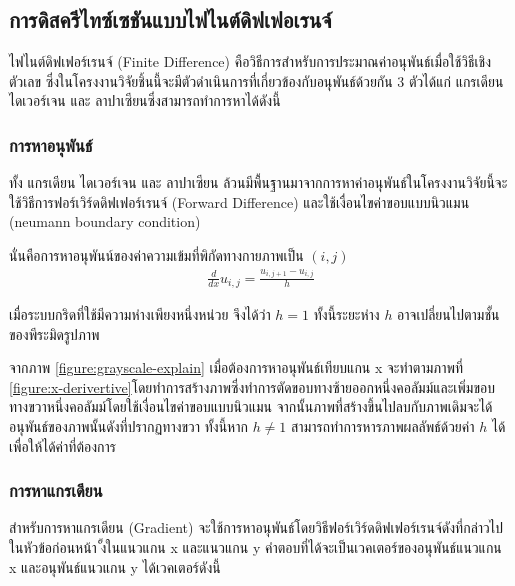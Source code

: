 \subsection{การดิสครีไทซ์เซชันแบบไฟไนต์ดิฟเฟอเรนจ์}

\hspace{1cm}ไฟไนต์ดิฟเฟอร์เรนจ์ (Finite Difference) คือวิธีการสำหรับการประมาณค่าอนุพันธ์เมื่อใช้วิธีเชิงตัวเลข ซึ่งในโครงงานวิจัยชิ้นนี้จะมีตัวดำเนินการที่เกี่ยวข้องกับอนุพันธ์ด้วยกัน 3 ตัวได้แก่ แกรเดียน ไดเวอร์เจน และ ลาปาเซียนซึ่งสามารถทำการหาได้ดังนี้

\subsubsection{การหาอนุพันธ์}

\hspace{1cm}ทั้ง แกรเดียน ไดเวอร์เจน และ ลาปาเซียน ล้วนมีพื้นฐานมาจากการหาค่าอนุพันธ์ในโครงงานวิจัยนี้จะใช้วิธีการฟอร์เวิร์ดดิฟเฟอร์เรนจ์ (Forward Difference) และใช้เงื่อนไขค่าขอบแบบนิวแมน (neumann boundary condition)

\noindent\hspace{1cm}นั่นคือการหาอนุพันน์ของค่าความเข้มที่พิกัดทางกายภาพเป็น $(i,j)$
\begin{align*}
	\frac{d}{dx} u_{i,j} = \frac{u_{i,j+1} - u_{i,j}}{h}
\end{align*}

เมื่อระบบกริดที่ใช้มีความห่างเพียงหนึ่งหน่วย จึงได้ว่า $h=1$ ทั้งนี้ระยะห่าง $h$ อาจเปลี่ยนไปตามชั้นของพีระมิดรูปภาพ



\hspace{1cm} จากภาพ \ref{figure:grayscale-explain} เมื่อต้องการหาอนุพันธ์เทียบแกน x จะทำตามภาพที่ \ref{figure:x-derivertive}โดยทำการสร้างภาพซึ่งทำการตัดขอบทางซ้ายออกหนึ่งคอลัมม์และเพิ่มขอบทางขวาหนึ่งคอลัมม์โดยใช้เงื่อนไขค่าขอบแบบนิวแมน จากนั้นภาพที่สร้างขึ้นไปลบกับภาพเดิมจะได้อนุพันธ์ของภาพนั้นดังที่ปรากฏทางขวา ทั้งนี้หาก $ h \neq 1 $ สามารถทำการหารภาพผลลัพธ์ด้วยค่า $h$ ได้เพื่อให้ได้ค่าที่ต้องการ

\subsubsection{การหาแกรเดียน}
\noindent\hspace{1cm}สำหรับการหาแกรเดียน (Gradient) จะใช้การหาอนุพันธ์โดยวิธีฟอร์เวิร์ดดิฟเฟอร์เรนจ์ดังที่กล่าวไปในหัวข้อก่อนหน้า ั้งในแนวแกน x และแนวแกน y คำตอบที่ได้จะเป็นเวคเตอร์ของอนุพันธ์แนวแกน x และอนุพันธ์แนวแกน y  ได้เวคเตอร์ดังนี้ 

